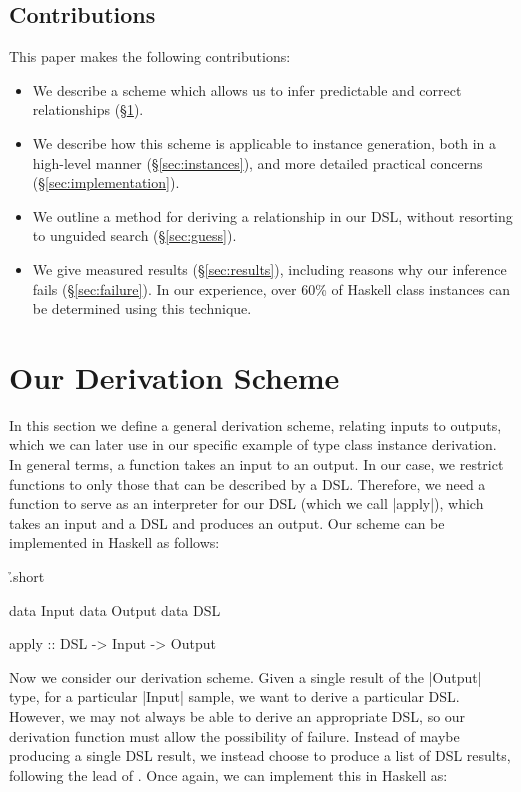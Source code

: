 \documentclass[preprint]{sigplanconf}
\begin{document}
\subsection{Contributions}

This paper makes the following contributions:

\begin{itemize}
\item We describe a scheme which allows us to infer predictable and correct relationships (\S\ref{sec:scheme}).
\item We describe how this scheme is applicable to instance generation, both in a high-level manner (\S\ref{sec:instances}), and more detailed practical concerns (\S\ref{sec:implementation}).
\item We outline a method for deriving a relationship in our DSL, without resorting to unguided search (\S\ref{sec:guess}).
\item We give measured results (\S\ref{sec:results}), including reasons why our inference fails (\S\ref{sec:failure}). In our experience, over 60\% of Haskell class instances can be determined using this technique.
\end{itemize}

\section{Our Derivation Scheme}
\label{sec:scheme}

In this section we define a general derivation scheme, relating inputs to outputs, which we can later use in our specific example of type class instance derivation. In general terms, a function takes an input to an output. In our case, we restrict functions to only those that can be described by a DSL. Therefore, we need a function to serve as an interpreter for our DSL (which we call |apply|), which takes an input and a DSL and produces an output. Our scheme can be implemented in Haskell as follows:

\h{.short}\begin{code}
data Input
data Output
data DSL

apply :: DSL -> Input -> Output
\end{code}

Now we consider our derivation scheme. Given a single result of the |Output| type, for a particular |Input| sample, we want to derive a particular DSL. However, we may not always be able to derive an appropriate DSL, so our derivation function must allow the possibility of failure. Instead of maybe producing a single DSL result, we instead choose to produce a list of DSL results, following the lead of \citet{wadler:list_of_successes}. Once again, we can implement this in Haskell as:
\end{document}
